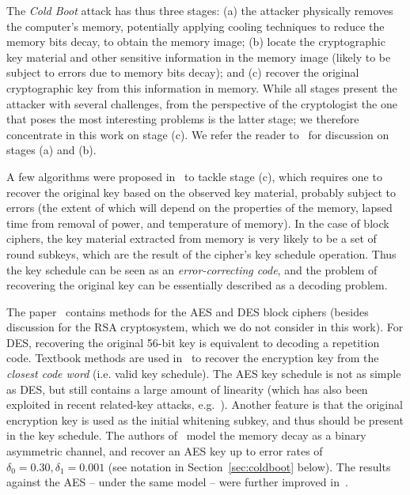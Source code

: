 \documentclass{llncs}
\newcommand{\coldboot}{\emph{Cold Boot}\xspace}
\begin{document}
The \coldboot attack has thus three stages: 
(a) the attacker physically removes the computer's memory, potentially applying cooling techniques to reduce the memory bits decay,
to obtain the memory image;
(b) locate the cryptographic key material and other sensitive information in the memory image (likely to  be subject to errors due to memory bits decay); and
(c) recover the original cryptographic key from this information in memory. 
While all stages present the attacker with several challenges, from the perspective of the cryptologist the one that poses the most interesting problems is the latter stage; we therefore concentrate in this work on stage (c).
We refer the reader to~\cite{coldboot,cryptoeprint:2008:510} for discussion on stages (a) and (b).

A few algorithms were proposed in~\cite{coldboot} to tackle stage (c), which requires one to recover the original key based on the observed key material, probably subject to errors (the extent of which will depend on the properties of the memory, lapsed time from removal of power, and temperature of memory). In the case of block ciphers, the key material extracted from memory is very likely to be a set of round subkeys, which are the result of the cipher's key schedule operation. Thus the key schedule can be seen as an \emph{error-correcting code}, and the problem of recovering the original key can be essentially described as a decoding problem.

The paper~\cite{coldboot} contains methods for the AES and DES block ciphers (besides discussion for the RSA cryptosystem, which we do not consider in this work). For DES, recovering the original 56-bit key is equivalent to decoding a repetition code. Textbook methods are used in~\cite{coldboot} to recover the encryption key from the \emph{closest code word} (i.e. valid key schedule). The AES key schedule is not as simple as DES, but still contains a large amount of linearity (which has also been exploited in recent related-key attacks, e.g.~\cite{aes-rka}). Another feature is that the original encryption key is used as the initial whitening subkey, and thus should be present in the key schedule. The authors of~\cite{coldboot} model the memory decay as a binary asymmetric channel, and recover an AES key up to error rates of $\delta_0 = 0.30,\delta_1=0.001$ (see notation in Section~\ref{sec:coldboot} below). The results against the AES -- under the same model -- were further improved in~\cite{tsow,aes-sat}.
 \\
\end{document}
